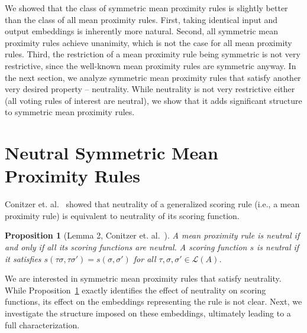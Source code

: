 \documentclass[10pt,letterpaper]{article}
\newcommand{\calL}{{\mathcal{L}}}
\newcommand{\rank}{{\calL(A)}}
\newtheorem{proposition}{Proposition}
\begin{document}

We showed that the class of symmetric mean proximity rules is slightly better than the class of all mean proximity rules. First, taking identical input and output embeddings is inherently more natural. Second, all symmetric mean proximity rules achieve unanimity, which is not the case for all mean proximity rules. Third, the restriction of a mean proximity rule being symmetric is not very restrictive, since the well-known mean proximity rules are symmetric anyway. In the next section, we analyze symmetric mean proximity rules that satisfy another very desired property -- neutrality. While neutrality is not very restrictive either (all voting rules of interest are neutral), we show that it adds significant structure to symmetric mean proximity rules. 


\section{Neutral Symmetric Mean Proximity Rules}

Conitzer et. al.~\cite{CRX09} showed that neutrality of a generalized scoring rule (i.e., a mean proximity rule) is equivalent to neutrality of its scoring function.
\begin{proposition}[Lemma 2, Conitzer et. al.~\cite{CRX09}]
A mean proximity rule is neutral if and only if all its scoring functions are neutral. A scoring function $s$ is neutral if it satisfies $s(\tau \sigma,\tau \sigma') = s(\sigma,\sigma')$ for all $\tau, \sigma, \sigma' \in \rank$.
\label{prop:gsr-neutral}
\end{proposition}

We are interested in symmetric mean proximity rules that satisfy neutrality. While Proposition~\ref{prop:gsr-neutral} exactly identifies the effect of neutrality on scoring functions, its effect on the embeddings representing the rule is not clear. Next, we investigate the structure imposed on these embeddings, ultimately leading to a full characterization.
\end{document}
